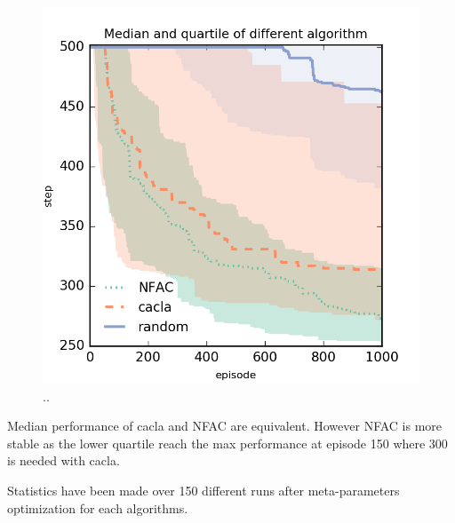 \begin{figure}[h]
	\begin{center}
		\includegraphics{result_plotting/adacrobot-1ddl_perf.png}
		\caption{..}
		\label{image:adacrobot_perf}
	\end{center}
\end{figure}


Median performance of cacla and NFAC are equivalent. However NFAC is more stable as the lower quartile reach the max performance
at episode 150 where 300 is needed with cacla.

Statistics have been made over 150 different runs after meta-parameters optimization for each algorithms.

